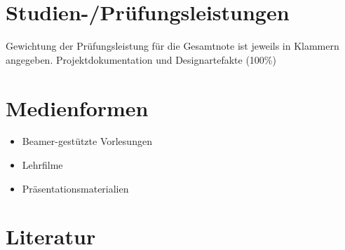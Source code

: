 \section*{Studien-/Prüfungsleistungen\label{/mi-2017/modulbeschreibungen-master/MA_HCI_InteractionDesign}}\label{studien-pruxfcfungsleistungenpathlabelmi-2017modulbeschreibungen-mastermaux5fhciux5finteractiondesign}

Gewichtung der Prüfungsleistung für die Gesamtnote ist jeweils in
Klammern angegeben. Projektdokumentation und Designartefakte (100\%)

\section*{Medienformen\label{/mi-2017/modulbeschreibungen-master/MA_HCI_InteractionDesign}}\label{medienformenpathlabelmi-2017modulbeschreibungen-mastermaux5fhciux5finteractiondesign}

\begin{itemize}
\tightlist
\item
  Beamer-gestützte Vorlesungen
\item
  Lehrfilme
\item
  Präsentationsmaterialien
\end{itemize}

\section*{Literatur\label{/mi-2017/modulbeschreibungen-master/MA_HCI_InteractionDesign}}\label{literaturpathlabelmi-2017modulbeschreibungen-mastermaux5fhciux5finteractiondesign}

